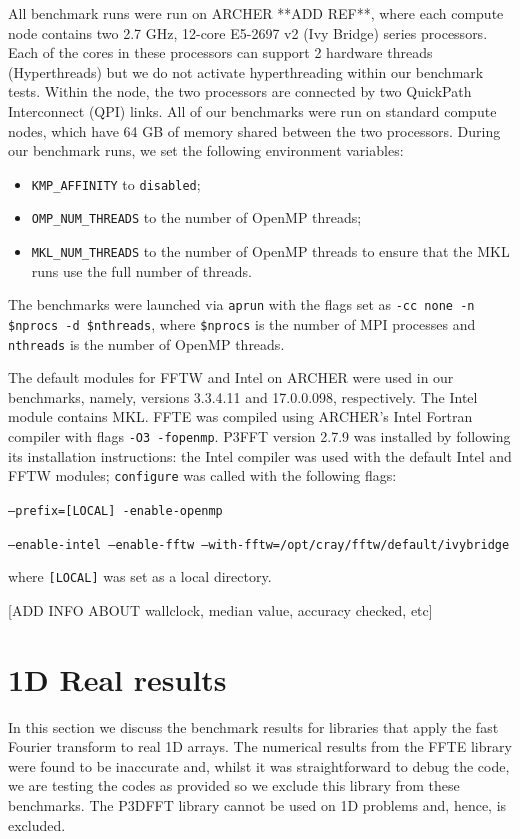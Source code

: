 \documentclass[a4]{article}
\begin{document}
All benchmark runs were run on ARCHER **ADD REF**, where each compute node 
contains two 
2.7 GHz, 12-core E5-2697 v2 (Ivy Bridge) series processors. Each of the cores 
in these processors can support 2 hardware threads (Hyperthreads) but we do 
not activate hyperthreading within our benchmark tests. Within the node, the 
two processors are connected by two QuickPath Interconnect (QPI) links. All of 
our benchmarks were run on standard compute nodes, which have 64 GB of memory 
shared between the two processors. During our benchmark runs, we set the following environment variables:
\begin{itemize}
\item \texttt{KMP\_AFFINITY} to \texttt{disabled};
\item \texttt{OMP\_NUM\_THREADS} to the number of OpenMP threads;
\item \texttt{MKL\_NUM\_THREADS} to the number of OpenMP threads to ensure that the MKL runs use the full number of threads.
\end{itemize}
The benchmarks were launched via \texttt{aprun} with the flags set as 
\texttt{-cc none -n \$nprocs -d \$nthreads}, where \texttt{\$nprocs} is the 
number of MPI processes and \texttt{nthreads} is the number of OpenMP threads.

The default modules for  FFTW and Intel on ARCHER were used in our benchmarks, 
namely, versions 3.3.4.11 and 17.0.0.098, respectively. The Intel module 
contains MKL. FFTE was compiled using ARCHER's Intel Fortran compiler with flags \texttt{-O3 -fopenmp}. P3FFT version 2.7.9 was installed by following its installation instructions: the Intel compiler was used with the default Intel and FFTW modules; \texttt{configure} was called with the following flags:

\noindent \texttt{--prefix=[LOCAL] -enable-openmp}

\noindent \texttt{--enable-intel --enable-fftw --with-fftw=/opt/cray/fftw/default/ivybridge}

\noindent where \texttt{[LOCAL]} was set as a local directory.

[ADD INFO ABOUT wallclock, median value, accuracy checked, etc]


\section{1D Real results}


In this section we discuss the benchmark results for libraries that apply the 
fast Fourier transform to real 1D arrays. The numerical results from the FFTE 
library were found to be inaccurate and, whilst it was straightforward to 
debug the code, we are testing the codes as provided so we exclude this 
library from these benchmarks. The P3DFFT library cannot be used on 1D 
problems and, hence, is excluded.
\end{document}
